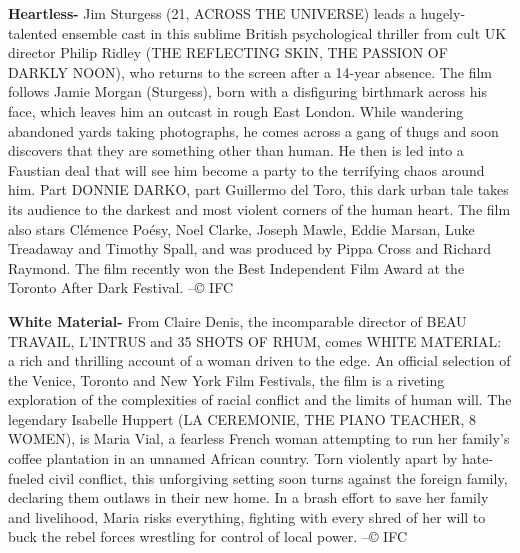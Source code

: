 \documentclass[11pt]{article}
\begin{document}
\textbf{Heartless-} Jim Sturgess (21, ACROSS THE UNIVERSE) leads a hugely-talented ensemble cast in this sublime British psychological thriller from cult UK director Philip Ridley (THE REFLECTING SKIN, THE PASSION OF DARKLY NOON), who returns to the screen after a 14-year absence. The film follows Jamie Morgan (Sturgess), born with a disfiguring birthmark across his face, which leaves him an outcast in rough East London. While wandering abandoned yards taking photographs, he comes across a gang of thugs and soon discovers that they are something other than human. He then is led into a Faustian deal that will see him become a party to the terrifying chaos around him. Part DONNIE DARKO, part Guillermo del Toro, this dark urban tale takes its audience to the darkest and most violent corners of the human heart. The film also stars Clémence Poésy, Noel Clarke, Joseph Mawle, Eddie Marsan, Luke Treadaway and Timothy Spall, and was produced by Pippa Cross and Richard Raymond. The film recently won the Best Independent Film Award at the Toronto After Dark Festival. --© IFC

\textbf{White Material-} From Claire Denis, the incomparable director of BEAU TRAVAIL, L'INTRUS and 35 SHOTS OF RHUM, comes WHITE MATERIAL: a rich and thrilling account of a woman driven to the edge. An official selection of the Venice, Toronto and New York Film Festivals, the film is a riveting exploration of the complexities of racial conflict and the limits of human will. The legendary Isabelle Huppert (LA CEREMONIE, THE PIANO TEACHER, 8 WOMEN), is Maria Vial, a fearless French woman attempting to run her family's coffee plantation in an unnamed African country. Torn violently apart by hate-fueled civil conflict, this unforgiving setting soon turns against the foreign family, declaring them outlaws in their new home. In a brash effort to save her family and livelihood, Maria risks everything, fighting with every shred of her will to buck the rebel forces wrestling for control of local power. --© IFC










\end{document}
